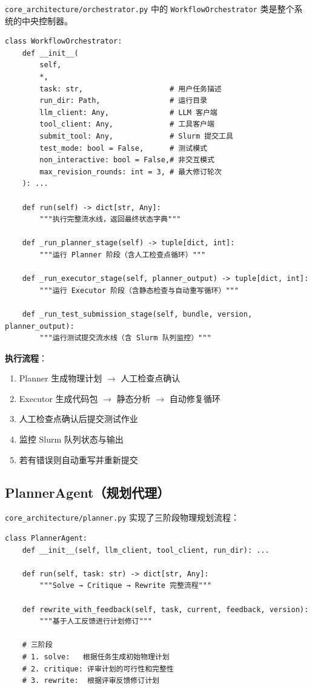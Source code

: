 \documentclass[12pt,a4paper]{ctexart}
\begin{document}
\label{sec:orchestrator}

\texttt{core\_architecture/orchestrator.py} 中的 \texttt{WorkflowOrchestrator} 类是整个系统的中央控制器。

\begin{lstlisting}[style=pycode]
class WorkflowOrchestrator:
    def __init__(
        self,
        *,
        task: str,                    # 用户任务描述
        run_dir: Path,                # 运行目录
        llm_client: Any,              # LLM 客户端
        tool_client: Any,             # 工具客户端
        submit_tool: Any,             # Slurm 提交工具
        test_mode: bool = False,      # 测试模式
        non_interactive: bool = False,# 非交互模式
        max_revision_rounds: int = 3, # 最大修订轮次
    ): ...

    def run(self) -> dict[str, Any]:
        """执行完整流水线，返回最终状态字典"""

    def _run_planner_stage(self) -> tuple[dict, int]:
        """运行 Planner 阶段（含人工检查点循环）"""

    def _run_executor_stage(self, planner_output) -> tuple[dict, int]:
        """运行 Executor 阶段（含静态检查与自动重写循环）"""

    def _run_test_submission_stage(self, bundle, version, planner_output):
        """运行测试提交流水线（含 Slurm 队列监控）"""
\end{lstlisting}

\textbf{执行流程}：
\begin{enumerate}[itemsep=3pt]
    \item Planner 生成物理计划 $\rightarrow$ 人工检查点确认
    \item Executor 生成代码包 $\rightarrow$ 静态分析 $\rightarrow$ 自动修复循环
    \item 人工检查点确认后提交测试作业
    \item 监控 Slurm 队列状态与输出
    \item 若有错误则自动重写并重新提交
\end{enumerate}

\subsection{PlannerAgent（规划代理）}

\label{sec:planner}

\texttt{core\_architecture/planner.py} 实现了三阶段物理规划流程：

\begin{lstlisting}[style=pycode]
class PlannerAgent:
    def __init__(self, llm_client, tool_client, run_dir): ...

    def run(self, task: str) -> dict[str, Any]:
        """Solve → Critique → Rewrite 完整流程"""

    def rewrite_with_feedback(self, task, current, feedback, version):
        """基于人工反馈进行计划修订"""

    # 三阶段
    # 1. solve:   根据任务生成初始物理计划
    # 2. critique: 评审计划的可行性和完整性
    # 3. rewrite:  根据评审反馈修订计划
\end{lstlisting}
\end{document}
